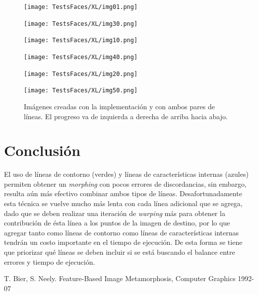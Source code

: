 \documentclass[conference]{IEEEtran}
\begin{document}
\begin{figure}[H]
\begin{multicols}{3}
    \centering
    \texttt{[image: TestsFaces/XL/img01.png]} \par
    \texttt{[image: TestsFaces/XL/img30.png]} \par
    
    \texttt{[image: TestsFaces/XL/img10.png]} \par
    \texttt{[image: TestsFaces/XL/img40.png]} \par

    \texttt{[image: TestsFaces/XL/img20.png]} \par
    \texttt{[image: TestsFaces/XL/img50.png]} \par
\end{multicols}
\caption{Imágenes creadas con la implementación y con ambos pares de líneas. El progreso va de izquierda a derecha de arriba hacia abajo.}
\end{figure}

\section*{Conclusión}
	El uso de líneas de contorno (verdes) y líneas de características internas (azules) permiten obtener un \textit{morphing} con pocos errores de discordancias, sin embargo, resulta aún más efectivo combinar ambos tipos de líneas. Desafortunadamente esta técnica se vuelve mucho más lenta con cada línea adicional que se agrega, dado que se deben realizar una iteración de \textit{warping} más para obtener la contribución de ésta línea a los puntos de la imagen de destino, por lo que agregar tanto como líneas de contorno como líneas de características internas tendrán un costo importante en el tiempo de ejecución. De esta forma se tiene que priorizar qué líneas se deben incluir si se está buscando el balance entre errores y tiempo de ejecución.
		
	
\begin{thebibliography}{99}
	  T. Bier, S. Neely. Feature-Based Image Metamorphosis, Computer Graphics 1992-07

\end{thebibliography}
\end{document}
